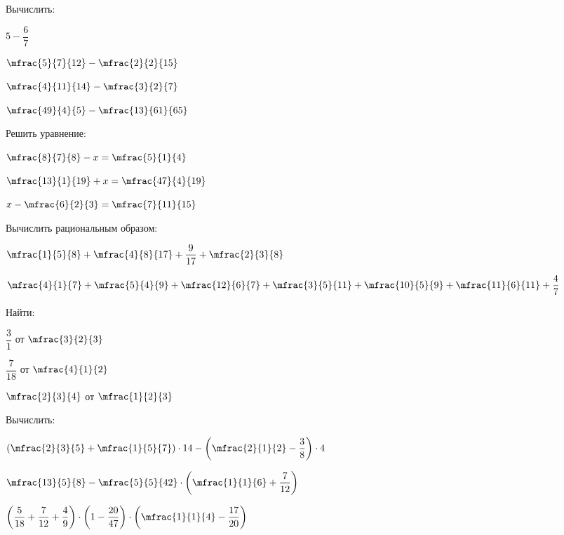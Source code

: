 \begin{class}[type=class, number=4]
	\begin{listofex}
		\item Вычислить:
		\begin{enumcols}[itemcolumns=4]
			\item \( 5-\dfrac{6}{7} \)
			\item \( \mfrac{5}{7}{12}-\mfrac{2}{2}{15} \)
			\item \( \mfrac{4}{11}{14}-\mfrac{3}{2}{7} \)
			\item \( \mfrac{49}{4}{5}-\mfrac{13}{61}{65} \)
		\end{enumcols}
		\item Решить уравнение:
		\begin{enumcols}[itemcolumns=3]
			\item \( \mfrac{8}{7}{8}-x=\mfrac{5}{1}{4} \)
			\item \( \mfrac{13}{1}{19}+x=\mfrac{47}{4}{19} \)
			\item \( x-\mfrac{6}{2}{3}=\mfrac{7}{11}{15} \)
		\end{enumcols}
		\item Вычислить рациональным образом:
		\begin{enumcols}[itemcolumns=2]
			\item \( \mfrac{1}{5}{8}+\mfrac{4}{8}{17}+\dfrac{9}{17}+\mfrac{2}{3}{8} \)
			\item \( \mfrac{4}{1}{7}+\mfrac{5}{4}{9}+\mfrac{12}{6}{7}+\mfrac{3}{5}{11}+\mfrac{10}{5}{9}+\mfrac{11}{6}{11}+\dfrac{4}{7} \)
		\end{enumcols}
		\item Найти:
		\begin{enumcols}[itemcolumns=3]
			\item \( \dfrac{3}{1} \) от \( \mfrac{3}{2}{3} \)
			\item \( \dfrac{7}{18} \) от \( \mfrac{4}{1}{2} \)
			\item \( \mfrac{2}{3}{4} \) от \( \mfrac{1}{2}{3} \)
		\end{enumcols}
		\item Вычислить: %
		\begin{enumcols}[itemcolumns=1]
			\item \( \left( \mfrac{2}{3}{5}+\mfrac{1}{5}{7} \right)\cdot14-\left( \mfrac{2}{1}{2}-\dfrac{3}{8} \right)\cdot4 \)
			\item \( \mfrac{13}{5}{8}-\mfrac{5}{5}{42}\cdot\left( \mfrac{1}{1}{6}+\dfrac{7}{12} \right) \)
			\item \( \left( \dfrac{5}{18}+\dfrac{7}{12}+\dfrac{4}{9} \right)\cdot\left( 1-\dfrac{20}{47} \right)\cdot\left( \mfrac{1}{1}{4}-\dfrac{17}{20} \right) \)

\end{enumcols}
\end{listofex}
\end{class}
